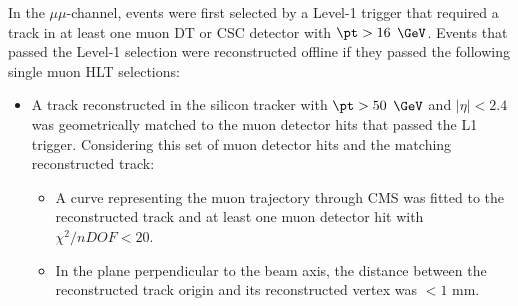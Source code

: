 In the $\mu\mu$-channel, events were first selected by a Level-1 trigger that required a track in at least one muon DT or 
CSC detector with $\pt > 16$ $\GeV$.  Events that passed the Level-1 selection were reconstructed offline if they 
passed the following single muon HLT selections:

\begin{itemize}
	\item A track reconstructed in the silicon tracker with $\pt > 50$ $\GeV$ and $|\eta| < 2.4$ was geometrically matched to 
		the muon detector hits that passed the L1 trigger.  Considering this set of muon detector hits and the matching reconstructed 
		track:
	\begin{itemize}
		\item A curve representing the muon trajectory through CMS was fitted to the reconstructed track and at least 
			one muon detector hit with $\chi^{2}/nDOF < 20$.
		\item In the plane perpendicular to the beam axis, the distance between the reconstructed track origin and its 
			reconstructed vertex was $< 1$ mm.
	\end{itemize}
\end{itemize}

